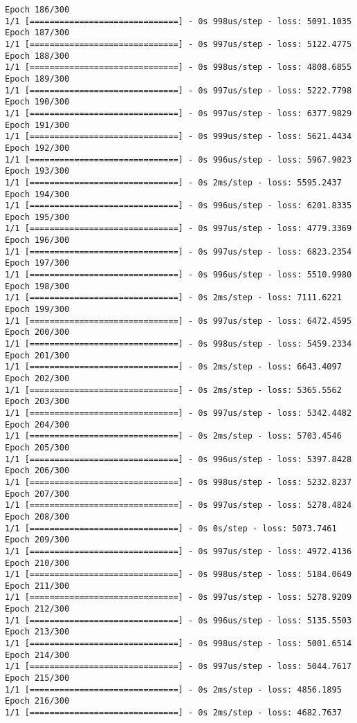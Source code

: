 \documentclass[11pt]{article}
\begin{document}
\begin{Verbatim}[commandchars=\\\{\}]
Epoch 186/300
1/1 [==============================] - 0s 998us/step - loss: 5091.1035
Epoch 187/300
1/1 [==============================] - 0s 997us/step - loss: 5122.4775
Epoch 188/300
1/1 [==============================] - 0s 998us/step - loss: 4808.6855
Epoch 189/300
1/1 [==============================] - 0s 997us/step - loss: 5222.7798
Epoch 190/300
1/1 [==============================] - 0s 997us/step - loss: 6377.9829
Epoch 191/300
1/1 [==============================] - 0s 999us/step - loss: 5621.4434
Epoch 192/300
1/1 [==============================] - 0s 996us/step - loss: 5967.9023
Epoch 193/300
1/1 [==============================] - 0s 2ms/step - loss: 5595.2437
Epoch 194/300
1/1 [==============================] - 0s 996us/step - loss: 6201.8335
Epoch 195/300
1/1 [==============================] - 0s 997us/step - loss: 4779.3369
Epoch 196/300
1/1 [==============================] - 0s 997us/step - loss: 6823.2354
Epoch 197/300
1/1 [==============================] - 0s 996us/step - loss: 5510.9980
Epoch 198/300
1/1 [==============================] - 0s 2ms/step - loss: 7111.6221
Epoch 199/300
1/1 [==============================] - 0s 997us/step - loss: 6472.4595
Epoch 200/300
1/1 [==============================] - 0s 998us/step - loss: 5459.2334
Epoch 201/300
1/1 [==============================] - 0s 2ms/step - loss: 6643.4097
Epoch 202/300
1/1 [==============================] - 0s 2ms/step - loss: 5365.5562
Epoch 203/300
1/1 [==============================] - 0s 997us/step - loss: 5342.4482
Epoch 204/300
1/1 [==============================] - 0s 2ms/step - loss: 5703.4546
Epoch 205/300
1/1 [==============================] - 0s 996us/step - loss: 5397.8428
Epoch 206/300
1/1 [==============================] - 0s 998us/step - loss: 5232.8237
Epoch 207/300
1/1 [==============================] - 0s 997us/step - loss: 5278.4824
Epoch 208/300
1/1 [==============================] - 0s 0s/step - loss: 5073.7461
Epoch 209/300
1/1 [==============================] - 0s 997us/step - loss: 4972.4136
Epoch 210/300
1/1 [==============================] - 0s 998us/step - loss: 5184.0649
Epoch 211/300
1/1 [==============================] - 0s 997us/step - loss: 5278.9209
Epoch 212/300
1/1 [==============================] - 0s 996us/step - loss: 5135.5503
Epoch 213/300
1/1 [==============================] - 0s 998us/step - loss: 5001.6514
Epoch 214/300
1/1 [==============================] - 0s 997us/step - loss: 5044.7617
Epoch 215/300
1/1 [==============================] - 0s 2ms/step - loss: 4856.1895
Epoch 216/300
1/1 [==============================] - 0s 2ms/step - loss: 4682.7637

\end{Verbatim}
\end{document}
